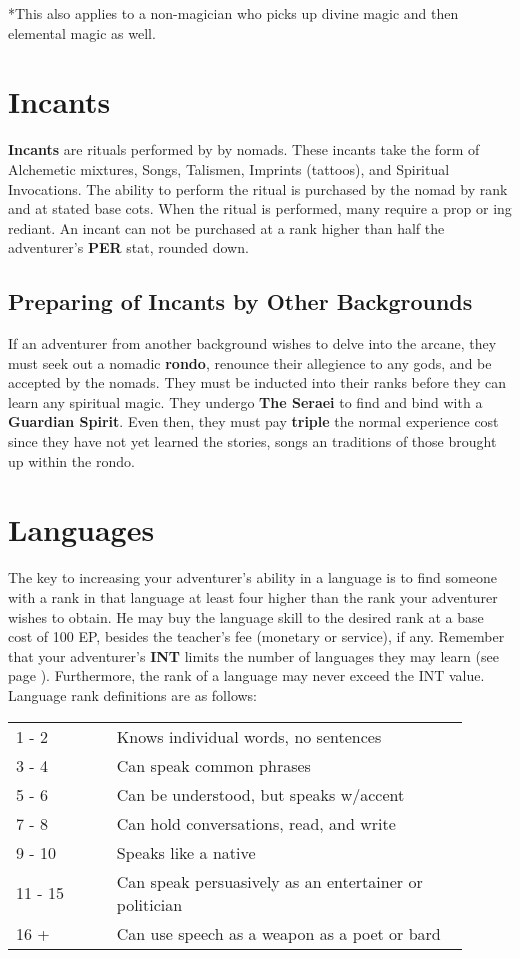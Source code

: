 \begin{multicols*}{2}
*This also applies to a non-magician who picks up divine magic and then elemental magic as well.

\section{Incants}
\textbf{Incants} are rituals performed by by nomads. These
incants take the form of Alchemetic mixtures, Songs, Talismen, Imprints (tattoos), and Spiritual Invocations. The ability to perform the ritual is purchased by the nomad by
rank and at stated base cots. When the ritual is performed, many require a prop or ing rediant. An incant can not be purchased at a rank higher than half the adventurer’s \textbf{PER} stat, rounded down.
\subsection{Preparing of Incants by Other Backgrounds}
If an adventurer from another background wishes to delve into the arcane, they must seek out a nomadic \textbf{rondo}, renounce their allegience to any gods, and be accepted by the nomads. They must be inducted into their ranks before they can learn any spiritual magic. They undergo \textbf{The Seraei} to find and bind with a \textbf{Guardian Spirit}. Even then, they must pay \textbf{triple} the normal experience cost since they have not yet learned the stories, songs an traditions of those brought up within the rondo.
\section{Languages}
The key to increasing your adventurer’s ability in a language is to find someone with a rank in that language at least four higher than the rank your adventurer wishes to obtain. He may buy the language skill to the desired rank at a base cost of 100 EP, besides the teacher’s fee (monetary or service), if any. Remember that your adventurer’s \textbf{INT} limits the number of languages they may learn (see page \textbf{\pageref{create-language}}). Furthermore, the rank of a language may never exceed the
INT value. Language rank definitions are as follows:

\begin{tcolorbox}[breakable,boxrule=0pt]
\begin{tabular}{p{0.2\linewidth} p{0.7\linewidth}}
1 - 2  & Knows individual words, no sentences\\
3 - 4  & Can speak common phrases\\
5 - 6  & Can be understood, but speaks w/accent\\
7 - 8  & Can hold conversations, read, and write\\
9 - 10  & Speaks like a native\\
11 - 15  & Can speak persuasively as an entertainer or politician\\
16 + & Can use speech as a weapon as a poet or bard\\
\end{tabular}
\end{tcolorbox}

\end{multicols*}

